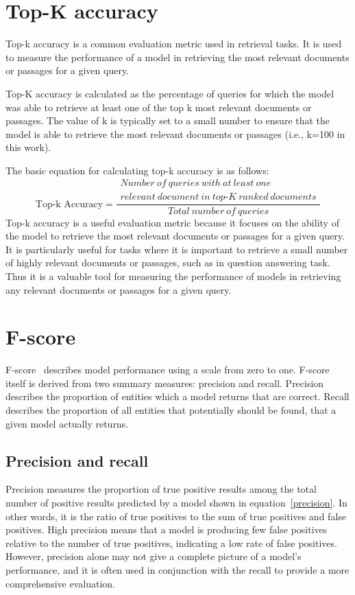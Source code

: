 \section{Top-K accuracy}
Top-k accuracy is a common evaluation metric used in retrieval tasks. It is used to measure the performance of a model in retrieving the most relevant documents or passages for a given query.

Top-K accuracy is calculated as the percentage of queries for which the model was able to retrieve at least one of the top k most relevant documents or passages. The value of k is typically set to a small number to ensure that the model is able to retrieve the most relevant documents or passages (i.e., k=100 in this work).

The basic equation for calculating top-k accuracy is as follows:
\begin{equation}
    \text{Top-k Accuracy} = \frac{\substack{Number\ of\ queries\ with\ at\ least\ one\\ relevant\ document\ in\ top\text{-}K\ ranked\ documents}}{Total\ number\ of\ queries}
\end{equation}
Top-k accuracy is a useful evaluation metric because it focuses on the ability of the model to retrieve the most relevant documents or passages for a given query. It is particularly useful for tasks where it is important to retrieve a small number of highly relevant documents or passages, such as in question answering task. Thus it is a valuable tool for measuring the performance of models in retrieving any relevant documents or passages for a given query.


\section{F-score}
F-score~\cite{f-score} describes model performance using a scale from zero to one. F-score itself is derived from two summary measures: precision and recall. Precision describes the proportion of entities which a model returns that are correct. Recall describes the proportion of all entities that potentially should be found, that a given model actually returns.

\subsection*{Precision and recall}
Precision measures the proportion of true positive results among the total number of positive results predicted by a model shown in equation~\ref{precision}. In other words, it is the ratio of true positives to the sum of true positives and false positives. High precision means that a model is producing few false positives relative to the number of true positives, indicating a low rate of false positives. However, precision alone may not give a complete picture of a model's performance, and it is often used in conjunction with the recall to provide a more comprehensive evaluation.

